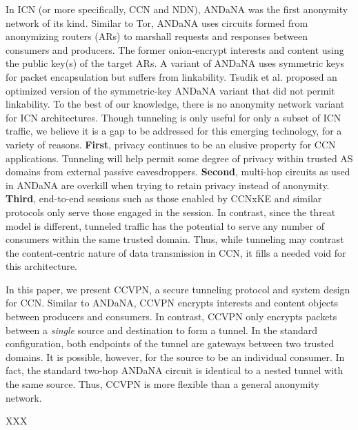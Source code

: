 In ICN (or more specifically, CCN and NDN), ANDaNA was the first anonymity network of its
kind. Similar to Tor, ANDaNA uses circuits formed from anonymizing routers (ARs)
to marshall requests and responses between consumers and producers. The former
onion-encrypt interests and content using the public key(s) of the target ARs.
A variant of ANDaNA uses symmetric keys for packet encapsulation but suffers from
linkability. Tsudik et al. \cite{ac3n} proposed an optimized version of the symmetric-key
ANDaNA variant that did not permit linkability. To the best of our knowledge, there
is no anonymity network variant for ICN architectures. Though tunneling is only
useful for only a subset of ICN traffic, we believe it is a gap to be addressed
for this emerging technology, for a variety of reasons. {\bf First}, privacy
continues to be an elusive property for CCN applications. Tunneling will help
permit some degree of privacy within trusted AS domains from external passive
eavesdroppers. {\bf Second}, multi-hop circuits as used in ANDaNA are overkill
when trying to retain privacy instead of anonymity. {\bf Third}, end-to-end
sessions such as those enabled by CCNxKE \cite{ccnxke} and similar protocols
only serve those engaged in the session. In contrast, since the threat model is
different, tunneled traffic has the potential to serve any number of consumers
within the same trusted domain. Thus, while tunneling may contrast the content-centric
nature of data transmission in CCN, it fills a needed void for this architecture.

In this paper, we present CCVPN, a secure tunneling protocol and system design for
CCN. Similar to ANDaNA, CCVPN encrypts interests and content objects between producers
and consumers. In contrast, CCVPN only encrypts packets between a \emph{single}
source and destination to form a tunnel. In the standard configuration, both
endpoints of the tunnel are gateways between two trusted domains. It is possible,
however, for the source to be an individual consumer. In fact, the standard two-hop
ANDaNA circuit is identical to a nested tunnel with the same source. Thus,
CCVPN is more flexible than a general anonymity network.

XXX
